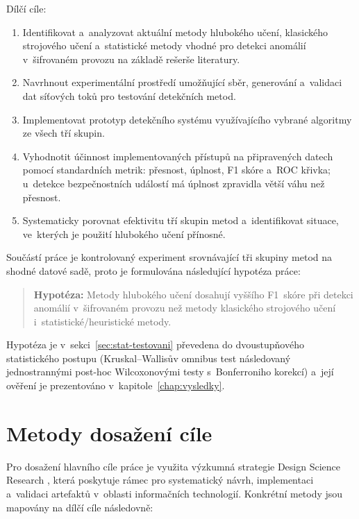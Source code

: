 Dílčí cíle:
\begin{enumerate}
\item Identifikovat a~analyzovat aktuální metody hlubokého učení, klasického strojového učení a~statistické metody vhodné pro detekci anomálií v~šifrovaném provozu na základě rešerše literatury.
\item Navrhnout experimentální prostředí umožňující sběr, generování a~validaci dat síťových toků pro testování detekčních metod.
\item Implementovat prototyp detekčního systému využívajícího vybrané algoritmy ze všech tří skupin.
\item Vyhodnotit účinnost implementovaných přístupů na připravených datech pomocí standardních metrik: přesnost, úplnost, F1 skóre a~ROC křivka; u~detekce bezpečnostních událostí má úplnost zpravidla větší váhu než přesnost.
\item Systematicky porovnat efektivitu tří skupin metod a~identifikovat situace, ve~kterých je použití hlubokého učení přínosné.
\end{enumerate}

Součástí práce je kontrolovaný experiment srovnávající tři skupiny metod na shodné datové sadě, proto je formulována následující hypotéza práce:

\begin{quote}
\textbf{Hypotéza:} Metody hlubokého učení dosahují vyššího F1~skóre při detekci anomálií v~šifrovaném provozu než metody klasického strojového učení i~statistické/heuristické metody.
\end{quote}

\noindent Hypotéza je v~sekci~\ref{sec:stat-testovani} převedena do dvoustupňového statistického postupu (Kruskal--Wallisův omnibus test následovaný jednostrannými post-hoc Wilcoxonovými testy s~Bonferroniho korekcí) a~její ověření je prezentováno v~kapitole~\ref{chap:vysledky}.

\section*{Metody dosažení cíle}

Pro dosažení hlavního cíle práce je využita výzkumná strategie Design Science Research \parencite{Peffers2007}, která poskytuje rámec pro systematický návrh, implementaci a~validaci artefaktů v~oblasti informačních technologií. Konkrétní metody jsou mapovány na dílčí cíle následovně:

